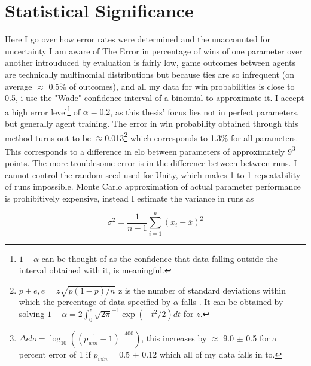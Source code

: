 \section{Statistical Significance}\label{sec:disc:significance}
Here I go over how error rates were determined and the unaccounted for uncertainty I am aware of The Error in percentage of wins of one parameter over another introuduced by evaluation is fairly low, game outcomes between agents are technically multinomial distributions but because ties are so infrequent (on average $\approx$ 0.5\% of outcomes), and all my data for win probabilities is close to 0.5, i use the "Wade" confidence interval of a binomial\cite[p. 2]{binomial_confidence} to approximate it. I accept a high error level\footnote{$1-\alpha$ can be thought of as the confidence that data falling outside the interval obtained with it, is meaningful.} of $\alpha = 0.2$, as this thesis' focus lies not in perfect parameters, but generally agent training. The error in win probability obtained through this method turns out to be $\approx$0.013\footnote{$p \pm e, e = z\sqrt{p(1-p)/n}$ z is the number of standard deviations within which the percentage of data specified by $\alpha$ falls \cite[p. 2]{binomial_confidence}. It can be obtained by solving $1-\alpha = 2\int_0^z \sqrt{2\pi}^{-1}\exp(-t^2/2)dt$ for $z$.} which corresponds to 1.3\% for all parameters. This corresponds to a difference in elo between parameters of approximately 9\footnote{$\Delta elo = \log_{10}\left(\left(p_{win}^{-1}-1\right)^{-400}\right)$, this increases by $\approx$ 9.0 $\pm$ 0.5 for a percent error of 1 if $p_{win} = 0.5$ $\pm$ 0.12 which all of my data falls in to.} points. The more troublesome error is in the difference between between runs. I cannot control the random seed used for Unity, which makes 1 to 1 repeatability of runs impossible. Monte Carlo approximation of actual parameter performance is prohibitively expensive, instead I estimate the variance in runs as

\begin{equation*}
    \sigma^2 = \frac{1}{n-1} \sum_{i=1}^{n} \left( x_i - \overline{x} \right)^2
\end{equation*}

